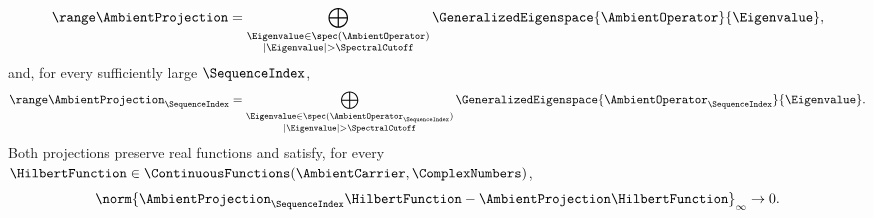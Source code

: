 \begin{proposition}
\[
 \range\AmbientProjection
 =\bigoplus_{\substack{\Eigenvalue\in\spec(\AmbientOperator)\\|\Eigenvalue|>\SpectralCutoff}}
 \GeneralizedEigenspace{\AmbientOperator}{\Eigenvalue},
\]
and, for every sufficiently large $\SequenceIndex$,
\[
 \range\AmbientProjection_\SequenceIndex
 =\bigoplus_{\substack{\Eigenvalue\in\spec(\AmbientOperator_\SequenceIndex)\\|\Eigenvalue|>\SpectralCutoff}}
 \GeneralizedEigenspace{\AmbientOperator_\SequenceIndex}{\Eigenvalue}.
\]
Both projections preserve real functions and satisfy,
for every
$\HilbertFunction\in\ContinuousFunctions(\AmbientCarrier,\ComplexNumbers)$,
\[
 \norm{\AmbientProjection_\SequenceIndex\HilbertFunction
       -\AmbientProjection\HilbertFunction}_\infty\to0.
\]
\end{proposition}

